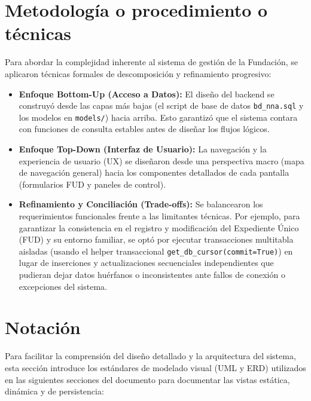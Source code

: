 \section{Metodología o procedimiento o técnicas}
\label{sec:metodologiaDiseno}

Para abordar la complejidad inherente al sistema de gestión de la Fundación, se aplicaron técnicas formales de descomposición y refinamiento progresivo:

\begin{itemize}
    \item \textbf{Enfoque Bottom-Up (Acceso a Datos):} El diseño del backend se construyó desde las capas más bajas (el script de base de datos \texttt{bd\_nna.sql} y los modelos en \texttt{models/}) hacia arriba. Esto garantizó que el sistema contara con funciones de consulta estables antes de diseñar los flujos lógicos.
    \item \textbf{Enfoque Top-Down (Interfaz de Usuario):} La navegación y la experiencia de usuario (UX) se diseñaron desde una perspectiva macro (mapa de navegación general) hacia los componentes detallados de cada pantalla (formularios FUD y paneles de control).
    \item \textbf{Refinamiento y Conciliación (Trade-offs):} Se balancearon los requerimientos funcionales frente a las limitantes técnicas. Por ejemplo, para garantizar la consistencia en el registro y modificación del Expediente Único (FUD) y su entorno familiar, se optó por ejecutar transacciones multitabla aisladas (usando el helper transaccional \texttt{get\_db\_cursor(commit=True)}) en lugar de inserciones y actualizaciones secuenciales independientes que pudieran dejar datos huérfanos o inconsistentes ante fallos de conexión o excepciones del sistema.
\end{itemize}

\section{Notación}
\label{sec:notacionDiseno}

Para facilitar la comprensión del diseño detallado y la arquitectura del sistema, esta sección introduce los estándares de modelado visual (UML y ERD) utilizados en las siguientes secciones del documento para documentar las vistas estática, dinámica y de persistencia:

